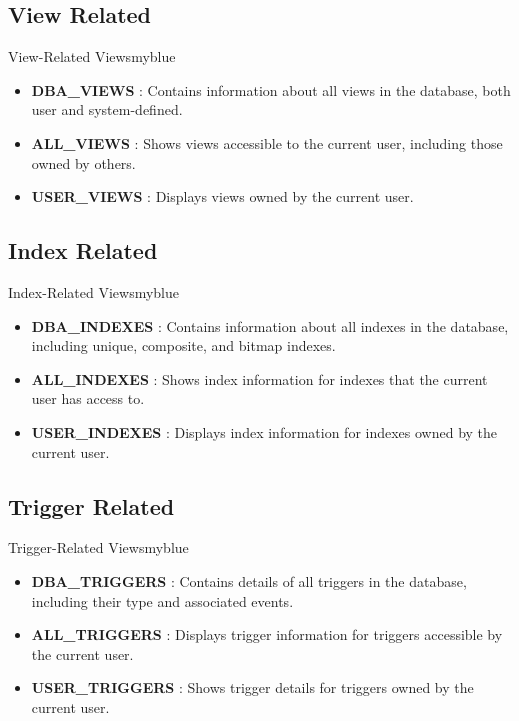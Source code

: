\vspace{0.25cm}
\subsection{View Related}
\begin{prettyBox}{View-Related Views}{myblue}
\begin{itemize}
    \item \textbf{DBA\_VIEWS} : Contains information about all views in the database, both user and system-defined.
    \item \textbf{ALL\_VIEWS} : Shows views accessible to the current user, including those owned by others.
    \item \textbf{USER\_VIEWS} : Displays views owned by the current user.
\end{itemize}
\end{prettyBox}

\vspace{0.25cm}
\subsection{Index Related}
\begin{prettyBox}{Index-Related Views}{myblue}
\begin{itemize}
    \item \textbf{DBA\_INDEXES} : Contains information about all indexes in the database, including unique, composite, and bitmap indexes.
    \item \textbf{ALL\_INDEXES} : Shows index information for indexes that the current user has access to.
    \item \textbf{USER\_INDEXES} : Displays index information for indexes owned by the current user.
\end{itemize}
\end{prettyBox}

\vspace{0.25cm}
\subsection{Trigger Related}
\begin{prettyBox}{Trigger-Related Views}{myblue}
\begin{itemize}
    \item \textbf{DBA\_TRIGGERS} : Contains details of all triggers in the database, including their type and associated events.
    \item \textbf{ALL\_TRIGGERS} : Displays trigger information for triggers accessible by the current user.
    \item \textbf{USER\_TRIGGERS} : Shows trigger details for triggers owned by the current user.
\end{itemize}
\end{prettyBox}

